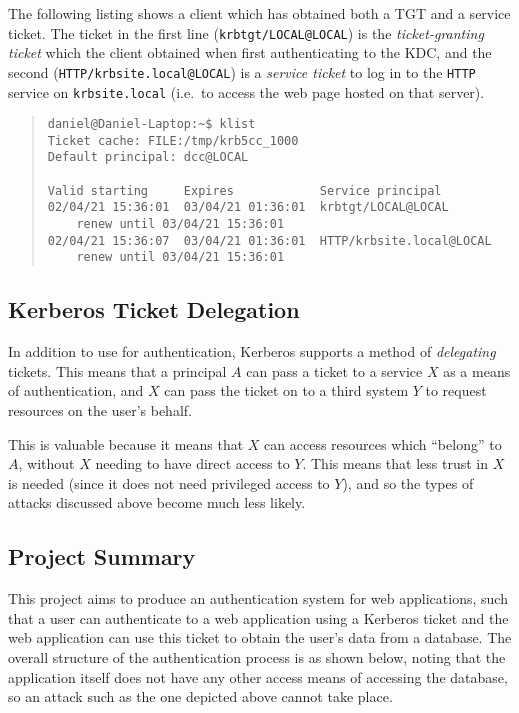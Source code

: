 \documentclass{article}
\begin{document}
The following listing shows a client which has obtained both a TGT and a service ticket. The ticket in the first line (\verb+krbtgt/LOCAL@LOCAL+) is the \textit{ticket-granting ticket} which the client obtained when first authenticating to the KDC, and the second (\verb+HTTP/krbsite.local@LOCAL+) is a \textit{service ticket} to log in to the \verb+HTTP+ service on \verb+krbsite.local+ (i.e.\ to access the web page hosted on that server).

\begin{quote}
\begin{verbatim}
daniel@Daniel-Laptop:~$ klist
Ticket cache: FILE:/tmp/krb5cc_1000
Default principal: dcc@LOCAL

Valid starting     Expires            Service principal
02/04/21 15:36:01  03/04/21 01:36:01  krbtgt/LOCAL@LOCAL
	renew until 03/04/21 15:36:01
02/04/21 15:36:07  03/04/21 01:36:01  HTTP/krbsite.local@LOCAL
	renew until 03/04/21 15:36:01
\end{verbatim}
\end{quote}

\subsection{Kerberos Ticket Delegation}
In addition to use for authentication, Kerberos supports a method of \textit{delegating} tickets. This means that a principal $A$ can pass a ticket to a service $X$ as a means of authentication, and $X$ can pass the ticket on to a third system $Y$ to request resources on the user's behalf.

This is valuable because it means that $X$ can access resources which ``belong'' to $A$, without $X$ needing to have direct access to $Y$. This means that less trust in $X$ is needed (since it does not need privileged access to $Y$), and so the types of attacks discussed above become much less likely.

\subsection{Project Summary}
This project aims to produce an authentication system for web applications, such that a user can authenticate to a web application using a Kerberos ticket and the web application can use this ticket to obtain the user's data from a database. The overall structure of the authentication process is as shown below, noting that the application itself does not have any other access means of accessing the database, so an attack such as the one depicted above cannot take place.
\end{document}
